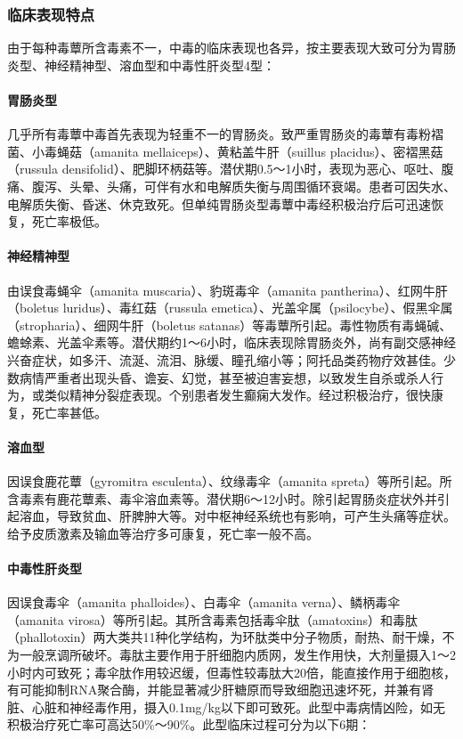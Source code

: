 \subsubsection{临床表现特点}

由于每种毒蕈所含毒素不一，中毒的临床表现也各异，按主要表现大致可分为胃肠炎型、神经精神型、溶血型和中毒性肝炎型4型：

\paragraph{胃肠炎型}

几乎所有毒蕈中毒首先表现为轻重不一的胃肠炎。致严重胃肠炎的毒蕈有毒粉褶菌、小毒蝇菇（amanita
mellaiceps）、黄粘盖牛肝（suillus placidus）、密褶黑菇（russula
densifolid）、肥脚环柄菇等。潜伏期0.5～1小时，表现为恶心、呕吐、腹痛、腹泻、头晕、头痛，可伴有水和电解质失衡与周围循环衰竭。患者可因失水、电解质失衡、昏迷、休克致死。但单纯胃肠炎型毒蕈中毒经积极治疗后可迅速恢复，死亡率极低。

\paragraph{神经精神型}

由误食毒蝇伞（amanita muscaria）、豹斑毒伞（amanita
pantherina）、红网牛肝（boletus luridus）、毒红菇（russula
emetica）、光盖伞属（psilocybe）、假黑伞属（stropharia）、细网牛肝（boletus
satanas）等毒蕈所引起。毒性物质有毒蝇碱、蟾蜍素、光盖伞素等。潜伏期约1～6小时，临床表现除胃肠炎外，尚有副交感神经兴奋症状，如多汗、流涎、流泪、脉缓、瞳孔缩小等；阿托品类药物疗效甚佳。少数病情严重者出现头昏、谵妄、幻觉，甚至被迫害妄想，以致发生自杀或杀人行为，或类似精神分裂症表现。个别患者发生癫痫大发作。经过积极治疗，很快康复，死亡率甚低。

\paragraph{溶血型}

因误食鹿花蕈（gyromitra esculenta）、纹缘毒伞（amanita
spreta）等所引起。所含毒素有鹿花蕈素、毒伞溶血素等。潜伏期6～12小时。除引起胃肠炎症状外并引起溶血，导致贫血、肝脾肿大等。对中枢神经系统也有影响，可产生头痛等症状。给予皮质激素及输血等治疗多可康复，死亡率一般不高。

\paragraph{中毒性肝炎型}

因误食毒伞（amanita phalloides）、白毒伞（amanita
verna）、鳞柄毒伞（amanita
virosa）等所引起。其所含毒素包括毒伞肽（amatoxins）和毒肽（phallotoxin）两大类共11种化学结构，为环肽类中分子物质，耐热、耐干燥，不为一般烹调所破坏。毒肽主要作用于肝细胞内质网，发生作用快，大剂量摄入1～2小时内可致死；毒伞肽作用较迟缓，但毒性较毒肽大20倍，能直接作用于细胞核，有可能抑制RNA聚合酶，并能显著减少肝糖原而导致细胞迅速坏死，并兼有肾脏、心脏和神经毒作用，摄入0.1mg/kg以下即可致死。此型中毒病情凶险，如无积极治疗死亡率可高达50\%～90\%。此型临床过程可分为以下6期：

